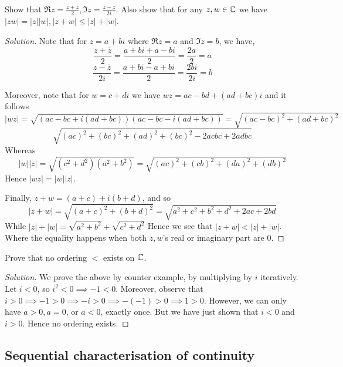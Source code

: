 \begin{example}
  Show that $\Re{z}=\frac{z+\bar{z}}{2}, \Im{z}=\frac{z-\bar{z}}{2i}$. Also show that for
  any $z,w\in\mathbb C$ we have $|zw|=|z||w|, |z+w|\leq |z|+|w|$.
\end{example}
\begin{proof}[Solution]
  Note that for $z=a+bi$ where $\Re{z}=a$ and $\Im{z}=b$, we have,
  \[\frac{z+\bar{z}}{2} = \frac{a+bi + a -bi}{2} = \frac{2a}{2}=a\]
  \[\frac{z-\bar{z}}{2i} = \frac{a+bi - a +bi}{2} = \frac{2bi}{2i}=b\]

  Moreover, note that for $w=c+di$ we have $wz=ac-bd + (ad +bc)i$ and it follows
  $|wz|= \sqrt{(ac-bc + i(ad+bc))(ac-bc - i(ad+bc))} = \sqrt{(ac-bc)^2 + (ad+bc)^2}$
  \[\sqrt{(ac)^2 + (bc)^2 + (ad)^2 + (bc)^2 - 2acbc +2adbc}\]
  Whereas
  \[|w||z|=\sqrt{(c^2+d^2)(a^2+b^2)} = \sqrt{(ac)^2 + (cb)^2 + (da)^2 + (db)^2}\]
  Hence $|wz|=|w||z|$.

  Finally, $z+w = (a+c) +i(b+d)$, and so 
  \[|z+w| = \sqrt{(a+c)^2 + (b+d)^2}=\sqrt{a^2 + c^2 +b^2+d^2 + 2ac+2bd}\]
  While $|z|+|w|=\sqrt{a^2 + b^2} + \sqrt{c^2+d^2}$
  Hence we see that $|z+w|<|z|+|w|$. Where the equality happens when both $z,w$'s real or
  imaginary part are 0.
\end{proof}
\begin{example}
  Prove that no ordering $<$ exists on $\mathbb C$.
\end{example}
\begin{proof}[Solution]
  We prove the above by counter example, by multiplying by $i$ iteratively. Let $i<0$, so
  $i^2<0\implies -1<0$. Moreover, observe that $i>0\implies -1>0 \implies  -i>0 \implies
  -(-1)>0 \implies 1>0$. However, we can only have $a>0,a=0$, or $a<0$, exactly once. But
  we have just shown that $i<0$ and $i>0$. Hence no ordering exists.
\end{proof}


\subsection{Sequential characterisation of continuity}

